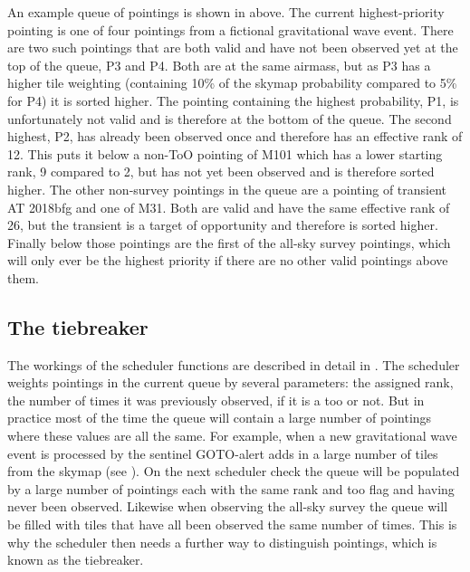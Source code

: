 \begin{colsection}
\begin{colsection}
An example queue of pointings is shown in  above. The current highest-priority pointing is one of four pointings from a fictional gravitational wave event. There are two such pointings that are both valid and have not been observed yet at the top of the queue, P3 and P4. Both are at the same airmass, but as P3 has a higher tile weighting (containing 10\% of the skymap probability compared to 5\% for P4) it is sorted higher. The pointing containing the highest probability, P1, is unfortunately not valid and is therefore at the bottom of the queue. The second highest, P2, has already been observed once and therefore has an effective rank of 12. This puts it below a non-ToO pointing of M101 which has a lower starting rank, 9 compared to 2, but has not yet been observed and is therefore sorted higher. The other non-survey pointings in the queue are a pointing of transient AT 2018bfg and one of M31. Both are valid and have the same effective rank of 26, but the transient is a target of opportunity and therefore is sorted higher. Finally below those pointings are the first of the all-sky survey pointings, which will only ever be the highest priority if there are no other valid pointings above them.

\end{colsection}

\newpage
\subsection{The tiebreaker}
\label{sec:scheduler_tiebreaker}
\begin{colsection}


The workings of the scheduler functions are described in detail in . The scheduler weights pointings in the current queue by several parameters: the assigned rank, the number of times it was previously observed, if it is a \gls{too} or not. But in practice most of the time the queue will contain a large number of pointings where these values are all the same. For example, when a new gravitational wave event is processed by the sentinel GOTO-alert adds in a large number of tiles from the skymap (see ). On the next scheduler check the queue will be populated by a large number of pointings each with the same rank and \gls{too} flag and having never been observed. Likewise when observing the all-sky survey the queue will be filled with tiles that have all been observed the same number of times. This is why the scheduler then needs a further way to distinguish pointings, which is known as the tiebreaker.


\end{colsection}
\end{colsection}
